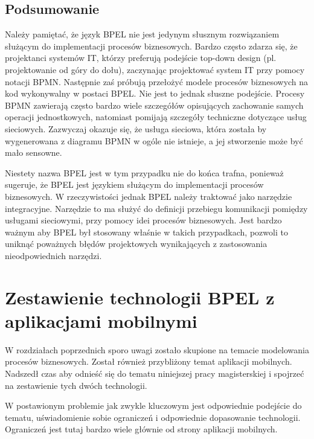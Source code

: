 \subsection{Podsumowanie}
\label{sec:bpelSummary}

Należy pamiętać, że język BPEL nie jest jedynym słusznym rozwiązaniem służącym do implementacji procesów biznesowych. Bardzo często  zdarza się, że projektanci systemów IT, którzy preferują podejście top-down design (pl. projektowanie od góry do dołu), zaczynając projektować system IT przy pomocy notacji BPMN. Następnie zaś próbują przełożyć modele procesów biznesowych na kod wykonywalny w postaci BPEL. Nie jest to jednak słuszne podejście. Procesy BPMN zawierają często bardzo wiele szczegółów opisujących zachowanie samych operacji jednostkowych, natomiast pomijają szczegóły techniczne dotyczące usług sieciowych.  Zazwyczaj okazuje się, że usługa sieciowa, która została by wygenerowana z diagramu BPMN w ogóle nie istnieje, a jej stworzenie może być mało sensowne.

Niestety nazwa BPEL jest w tym przypadku nie do końca trafna, ponieważ sugeruje, że BPEL jest językiem służącym do implementacji procesów biznesowych. W rzeczywistości jednak BPEL należy traktować jako narzędzie integracyjne. Narzędzie to ma służyć do definicji przebiegu komunikacji pomiędzy usługami sieciowymi, przy pomocy idei procesów biznesowych. Jest bardzo ważnym aby BPEL był stosowany właśnie w takich przypadkach, pozwoli to uniknąć poważnych błędów projektowych wynikających z zastosowania nieodpowiednich narzędzi.  



\section{Zestawienie technologii BPEL z aplikacjami mobilnymi}
\label{sec:bpelVSmobileApp}

W rozdziałach poprzednich sporo uwagi zostało skupione na temacie modelowania procesów biznesowych. Został również przybliżony temat aplikacji mobilnych. Nadszedł czas aby odnieść się do tematu niniejszej pracy magisterskiej i spojrzeć na zestawienie tych dwóch technologii. 

W postawionym problemie jak zwykle kluczowym jest odpowiednie podejście do tematu, uświadomienie sobie ograniczeń i odpowiednie dopasowanie technologii. Ograniczeń jest tutaj bardzo wiele głównie od strony aplikacji mobilnych.

